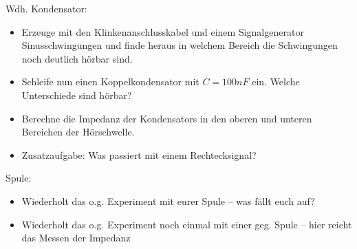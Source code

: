Wdh. Kondensator:

\begin{itemize}
    \item Erzeuge mit den Klinkenanschlusskabel und einem Signalgenerator
      Sinusschwingungen und finde heraus in welchem Bereich die Schwingungen
      noch deutlich hörbar sind.
    \item Schleife nun einen Koppelkondensator mit $C = 100 nF$ ein. Welche Unterschiede
      sind hörbar? 
    \item Berechne die Impedanz der Kondensators in den oberen und unteren
      Bereichen der Hörschwelle.
    \item Zusatzaufgabe: Was passiert mit einem Rechtecksignal?
\end{itemize}


Spule:

\begin{itemize}
  \item Wiederholt das o.g. Experiment mit eurer Spule -- was fällt euch auf?
  \item Wiederholt das o.g. Experiment noch einmal mit einer geg. Spule -- hier
    reicht das Messen der Impedanz %
\end{itemize}



